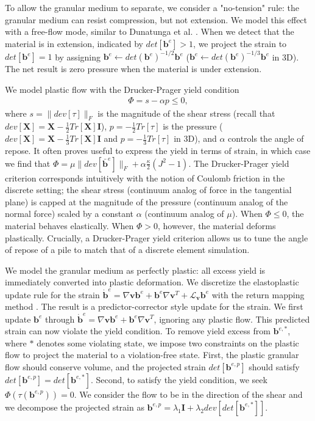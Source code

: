 To allow the granular medium to separate, we consider a "no-tension" rule: the granular medium can resist compression, but not extension. We model this effect with a free-flow mode, similar to Dunatunga et al. \cite{Dunatunga:2015:Continuum}. When we detect that the material is in extension, indicated by $det[\bm{b}^e] > 1$, we project the strain to $det[\bm{b}^e] = 1$ by assigning $\bm{b}^e \leftarrow det\left( \bm{b}^e \right)^{-1/2} \bm{b}^e$ ($\bm{b}^e \leftarrow det\left( \bm{b}^e \right)^{-1/3} \bm{b}^e$ in 3D). The net result is zero pressure when the material is under extension.

We model plastic flow with the Drucker-Prager yield condition
\begin{align}
\Phi = s - \alpha p \leq 0,
\end{align}
where $s = \| dev[\tau] \|_F$ is the magnitude of the shear stress (recall that $dev[\bm{X}] = \bm{X} - \frac{1}{2} Tr[\bm{X}] \bm{I}$), $p = -\frac{1}{2}Tr[\tau]$ is the pressure ($dev[\bm{X}] = \bm{X} - \frac{1}{3} Tr[\bm{X}] \bm{I}$ and $p = -\frac{1}{3}Tr[\tau]$ in 3D), and $\alpha$ controls the angle of repose. It often proves useful to express the yield in terms of strain, in which case we find that $\Phi = \mu \|  dev[ \bar{\bm{b}}^e ] \|_F + \alpha \frac{\kappa}{2} \left( J^2 - 1 \right)$. The Drucker-Prager yield criterion corresponds intuitively with the notion of Coulomb friction in the discrete setting; the shear stress (continuum analog of force in the tangential plane) is capped at the magnitude of the pressure (continuum analog of the normal force) scaled by a constant $\alpha$ (continuum analog of $\mu$). When $\Phi \leq 0$, the material behaves elastically. When $\Phi > 0$, however, the material deforms plastically. Crucially, a Drucker-Prager yield criterion allows us to tune the angle of repose of a pile to match that of a discrete element simulation.

We model the granular medium as perfectly plastic: all excess yield is immediately converted into plastic deformation. We discretize the elastoplastic update rule for the strain $\dot{\bm{b}}^e = \nabla \bm{v} \bm{b}^e + \bm{b}^e \nabla \bm{v}^T + \mathcal{L}_{\bm{v}} \bm{b}^e$ with the return mapping method \cite{Simo:1998}. The result is a predictor-corrector style update for the strain. We first update $\bm{b}^{e}$ through $\dot{\bm{b}}^e = \nabla \bm{v} \bm{b}^e + \bm{b}^e \nabla \bm{v}^T$, ignoring any plastic flow. This predicted strain can now violate the yield condition. To remove yield excess from $\bm{b}^{e,*}$, where $*$ denotes some violating state, we impose two constraints on the plastic flow to project the material to a violation-free state. First, the plastic granular flow should conserve volume, and the projected strain $det[\bm{b}^{e,p}]$ should satisfy $det[\bm{b}^{e,p}] = det[\bm{b}^{e,*}]$. Second, to satisfy the yield condition, we seek $\Phi\left( \tau\left( \bm{b}^{e,p} \right) \right) = 0$. We consider the flow to be in the direction of the shear and we decompose the projected strain as $\bm{b}^{e,p} = \lambda_1 \bm{I} + \lambda_2 dev[det[\bm{b}^{e,*}]]$.

